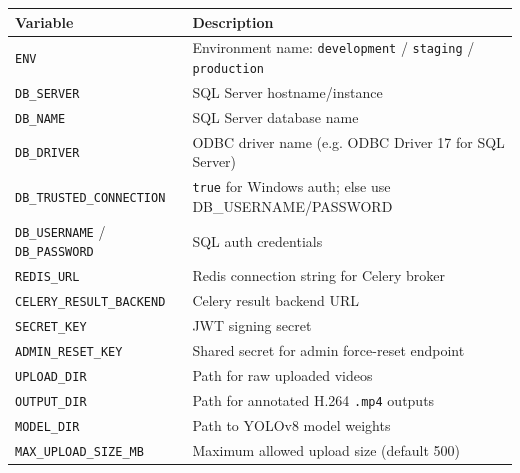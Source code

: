 ﻿\documentclass[11pt,a4paper]{article}
\begin{document}
\begin{longtable}{|L{5cm}|L{9cm}|}
\hline
\textbf{Variable} & \textbf{Description} \\ \hline
\texttt{ENV} & Environment name: \texttt{development} / \texttt{staging} / \texttt{production} \\ \hline
\texttt{DB\_SERVER} & SQL Server hostname/instance \\ \hline
\texttt{DB\_NAME} & SQL Server database name \\ \hline
\texttt{DB\_DRIVER} & ODBC driver name (e.g. ODBC Driver 17 for SQL Server) \\ \hline
\texttt{DB\_TRUSTED\_CONNECTION} & \texttt{true} for Windows auth; else use DB\_USERNAME/PASSWORD \\ \hline
\texttt{DB\_USERNAME} / \texttt{DB\_PASSWORD} & SQL auth credentials \\ \hline
\texttt{REDIS\_URL} & Redis connection string for Celery broker \\ \hline
\texttt{CELERY\_RESULT\_BACKEND} & Celery result backend URL \\ \hline
\texttt{SECRET\_KEY} & JWT signing secret \\ \hline
\texttt{ADMIN\_RESET\_KEY} & Shared secret for admin force-reset endpoint \\ \hline
\texttt{UPLOAD\_DIR} & Path for raw uploaded videos \\ \hline
\texttt{OUTPUT\_DIR} & Path for annotated H.264 \texttt{.mp4} outputs \\ \hline
\texttt{MODEL\_DIR} & Path to YOLOv8 model weights \\ \hline
\texttt{MAX\_UPLOAD\_SIZE\_MB} & Maximum allowed upload size (default 500) \\ \hline
\end{longtable}
\end{document}
